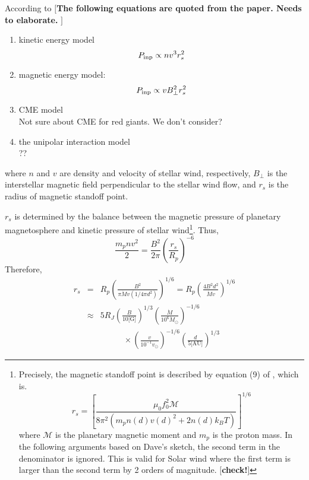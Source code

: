 \documentclass{emulateapj}
\def\memo#1{\color{red}$[${\bf #1}$]$ \color{black}}
\begin{document}
According to \citet{griebmeier2007} \memo{The following equations are quoted from the paper. Needs to elaborate. }
\begin{enumerate}
\item kinetic energy model
\begin{equation}
P_{\rm inp} \propto n v^3 r_s ^2 \label{eq:Pinp_kin}
\end{equation}
\item magnetic energy model:
\begin{equation}
P_{\rm inp} \propto v B_{\bot }^2 r_s ^2 \label{eq:Pinp_mag}
\end{equation}
\item CME model\\
Not sure about CME for red giants. We don't consider?
\item the unipolar interaction model\\
??
\end{enumerate}
where $n$ and $v$ are density and velocity of stellar wind, respectively,  $ B_{\bot }$ is the interstellar magnetic field perpendicular to the stellar wind flow, and $r_s$ is the radius of magnetic standoff point. 

$r_s$ is determined by the balance between the magnetic pressure of planetary magnetosphere and kinetic pressure of stellar wind\footnote{Precisely, the magnetic standoff point is described by equation (9) of \citet{griebmeier2007}, which is. 
\begin{equation}
r_s = \left[ \frac{\mu_0 f_0^2 \mathcal{M}}{8\pi^2 (m_p n(d) v(d)^2 + 2 n(d) k_B T)} \right]^{1/6}
\end{equation}
where $\mathcal{M}$ is the planetary magnetic moment and $m_p$ is the proton mass. 
In the following arguments based on Dave's sketch, the second term in the denominator is ignored. This is valid for Solar wind where the first term is larger than the second term by 2 orders of magnitude. \memo{check!}}. Thus, 
\begin{equation}
\frac{m_p n v ^2}{2} = \frac{B^2}{2\pi}\left( \frac{r_s}{R_p} \right)^{-6} 
\end{equation}
Therefore,
\begin{eqnarray}
r_s &=& R_p \left( \frac{B^2}{\pi \dot M v (1/4\pi d^2)} \right)^{1/6} = R_p \left( \frac{4 B^2 d^2}{\dot M v } \right)^{1/6} \\
&\approx & 5 R_J \left(\frac{B}{10 \mbox{[G]}}\right)^{1/3} \left(\frac{\dot M}{10^6 \dot M_{\odot}}\right)^{-1/6}\\
&& \;\;\;\;\; \;\;\;\;\; \times \left(\frac{v}{10^{-1} v_{\odot}}\right)^{-1/6}  \left(\frac{d}{5 \mbox{[AU]}}\right)^{1/3} 
\end{eqnarray}
\end{document}
